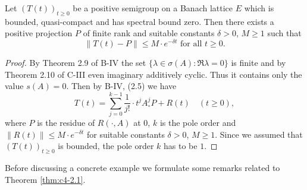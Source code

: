 \begin{theorem}\label{thm:c4-2.1}
%
%
%
Let $(T(t))_{t \geq 0}$ be a positive semigroup on a Banach lattice $E$ which is bounded, quasi-compact and has spectral bound zero.
Then there exists a positive projection $P$ of finite rank and suitable constants $\delta > 0$, $M \geq 1$ such that
\begin{equation}\label{eq:c4-2.1}
\|T(t) - P\| \leq M \cdot e^{-\delta t} \text{ for all } t \geq 0.
\end{equation}
\end{theorem}
\begin{proof}
By Theorem 2.9 of B-IV the set $\{\lambda \in \sigma(A) \colon \Re  \lambda = 0\}$ is finite and by Theorem 2.10 of C-III even imaginary additively cyclic.
Thus it contains only the value $s(A) = 0$.
Then by B-IV, (2.5) we have
\begin{equation*}\label{eq:c4-2.1-kgk}
T(t) = \sum_{j=0}^{k-1} \frac{1}{j!} \cdot t^{j}A^{j}_{\circ}P + R(t) \quad (t \geq 0),
\end{equation*}
where $P$ is the residue of $R(\cdot,A)$ at $0$, $k$ is the pole order and $\|R(t)\| \leq M \cdot e^{-\delta t}$ for suitable constants $\delta > 0$, $M \geq 1$.
Since we assumed that $(T(t))_{t \geq 0}$ is bounded, the pole order $k$ has to be $1$.
\end{proof}
Before discussing a concrete example we formulate some remarks related to Theorem \ref{thm:c4-2.1}.
